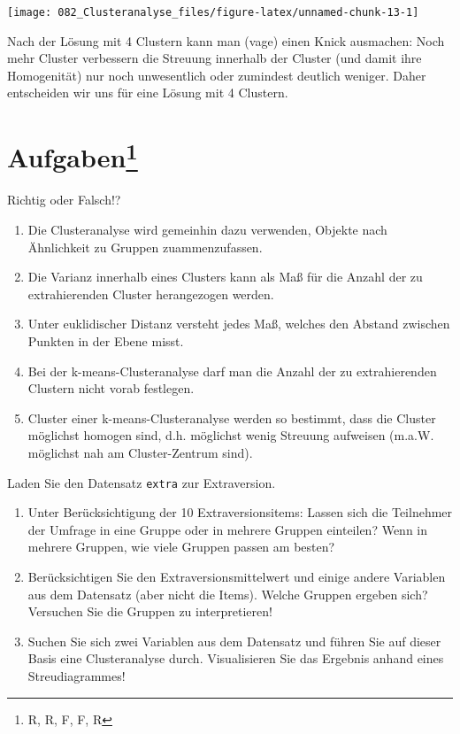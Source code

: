 \documentclass[12pt,ngerman,]{book}
\let\rmarkdownfootnote\footnote%
\def\footnote{\protect\rmarkdownfootnote}
\theoremstyle{definition}
\theoremstyle{definition}
\theoremstyle{remark}
\let\BeginKnitrBlock\begin \let\EndKnitrBlock\end
\begin{document}
\begin{center}\texttt{[image: 082\_Clusteranalyse\_files/figure-latex/unnamed-chunk-13-1]} \end{center}

Nach der Lösung mit 4 Clustern kann man (vage) einen Knick ausmachen:
Noch mehr Cluster verbessern die Streuung innerhalb der Cluster (und
damit ihre Homogenität) nur noch unwesentlich oder zumindest deutlich
weniger. Daher entscheiden wir uns für eine Lösung mit 4 Clustern.

\section[Aufgaben]{\texorpdfstring{Aufgaben\footnote{R, R, F, F, R}}{Aufgaben}}\label{aufgaben-15}

\BeginKnitrBlock{rmdexercises}
Richtig oder Falsch!?

\begin{enumerate}
\def\labelenumi{\arabic{enumi}.}
\item
  Die Clusteranalyse wird gemeinhin dazu verwenden, Objekte nach
  Ähnlichkeit zu Gruppen zuammenzufassen.
\item
  Die Varianz innerhalb eines Clusters kann als Maß für die Anzahl der
  zu extrahierenden Cluster herangezogen werden.
\item
  Unter euklidischer Distanz versteht jedes Maß, welches den Abstand
  zwischen Punkten in der Ebene misst.
\item
  Bei der k-means-Clusteranalyse darf man die Anzahl der zu
  extrahierenden Clustern nicht vorab festlegen.
\item
  Cluster einer k-means-Clusteranalyse werden so bestimmt, dass die
  Cluster möglichst homogen sind, d.h. möglichst wenig Streuung
  aufweisen (m.a.W. möglichst nah am Cluster-Zentrum sind).
\end{enumerate}
\EndKnitrBlock{rmdexercises}

Laden Sie den Datensatz \texttt{extra} zur Extraversion.

\begin{enumerate}
\def\labelenumi{\arabic{enumi}.}
\item
  Unter Berücksichtigung der 10 Extraversionsitems: Lassen sich die
  Teilnehmer der Umfrage in eine Gruppe oder in mehrere Gruppen
  einteilen? Wenn in mehrere Gruppen, wie viele Gruppen passen am
  besten?
\item
  Berücksichtigen Sie den Extraversionsmittelwert und einige andere
  Variablen aus dem Datensatz (aber nicht die Items). Welche Gruppen
  ergeben sich? Versuchen Sie die Gruppen zu interpretieren!
\item
  Suchen Sie sich zwei Variablen aus dem Datensatz und führen Sie auf
  dieser Basis eine Clusteranalyse durch. Visualisieren Sie das Ergebnis
  anhand eines Streudiagrammes!
\end{enumerate}
\end{document}
